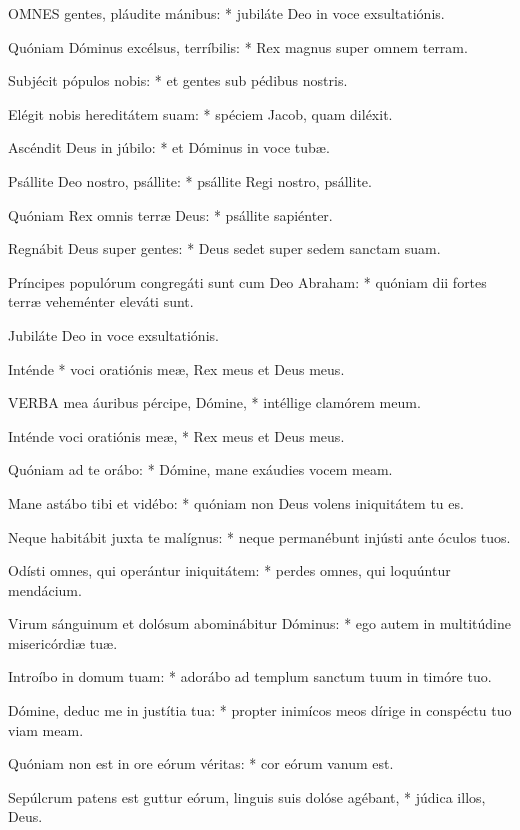 
\lettrine[lines=2]{O}{MNES} gentes, pláudite mánibus: * jubiláte Deo in voce exsultatiónis.

Quóniam Dóminus excélsus, terríbilis: * Rex magnus super omnem terram.

Subjécit pópulos nobis: * et gentes sub pédibus nostris.

Elégit nobis hereditátem suam: * spéciem Jacob, quam diléxit.

Ascéndit Deus in júbilo: * et Dóminus in voce tubæ.

Psállite Deo nostro, psállite: * psállite Regi nostro, psállite.

Quóniam Rex omnis terræ Deus: * psállite sapiénter.

Regnábit Deus super gentes: * Deus sedet super sedem sanctam suam.

Príncipes populórum congregáti sunt cum Deo Abraham: * quóniam dii fortes terræ veheménter eleváti sunt.

 Jubiláte Deo in voce exsultatiónis.

 Inténde * voci oratiónis meæ, Rex meus et Deus meus.


\lettrine[lines=2]{V}{ERBA} mea áuribus pércipe, Dómine, * intéllige clamórem meum.

Inténde voci oratiónis meæ, * Rex meus et Deus meus.

Quóniam ad te orábo: * Dómine, mane exáudies vocem meam.

Mane astábo tibi et vidébo: * quóniam non Deus volens iniquitátem tu es.

Neque habitábit juxta te malígnus: * neque permanébunt injústi ante óculos tuos.

Odísti omnes, qui operántur iniquitátem: * perdes omnes, qui loquúntur mendácium.

Virum sánguinum et dolósum abominábitur Dóminus: * ego autem in multitúdine misericórdiæ tuæ.

Introíbo in domum tuam: * adorábo ad templum sanctum tuum in timóre tuo.

Dómine, deduc me in justítia tua: * propter inimícos meos dírige in conspéctu tuo viam meam.

Quóniam non est in ore eórum véritas: * cor eórum vanum est.

Sepúlcrum patens est guttur eórum, linguis suis dolóse agébant, * júdica illos, Deus.

